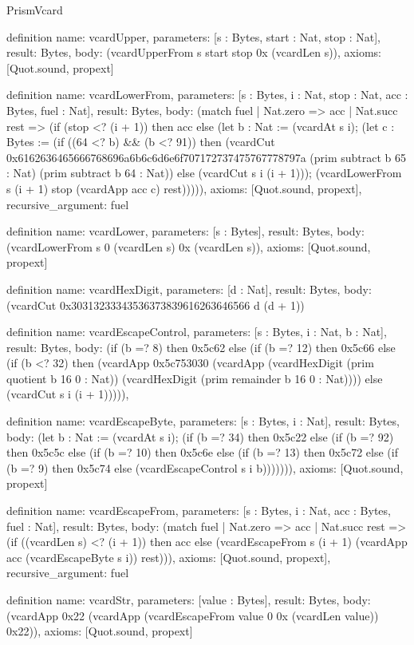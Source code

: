 \begin{lexlean}{PrismVcard}
\begin{semanticmodule}
definition{
  name: vcardUpper,
  parameters: [s : Bytes, start : Nat, stop : Nat],
  result: Bytes,
  body: (vcardUpperFrom s start stop 0x (vcardLen s)),
  axioms: [Quot.sound, propext]
}

definition{
  name: vcardLowerFrom,
  parameters: [s : Bytes, i : Nat, stop : Nat, acc : Bytes, fuel : Nat],
  result: Bytes,
  body: (match fuel
    | Nat.zero => acc
    | Nat.succ rest => (if (stop <? (i + 1)) then acc else (let b : Nat := (vcardAt s i); (let c : Bytes := (if ((64 <? b) && (b <? 91)) then (vcardCut 0x6162636465666768696a6b6c6d6e6f707172737475767778797a (prim subtract b 65 : Nat) (prim subtract b 64 : Nat)) else (vcardCut s i (i + 1))); (vcardLowerFrom s (i + 1) stop (vcardApp acc c) rest))))),
  axioms: [Quot.sound, propext],
  recursive_argument: fuel
}

definition{
  name: vcardLower,
  parameters: [s : Bytes],
  result: Bytes,
  body: (vcardLowerFrom s 0 (vcardLen s) 0x (vcardLen s)),
  axioms: [Quot.sound, propext]
}

definition{
  name: vcardHexDigit,
  parameters: [d : Nat],
  result: Bytes,
  body: (vcardCut 0x30313233343536373839616263646566 d (d + 1))
}

definition{
  name: vcardEscapeControl,
  parameters: [s : Bytes, i : Nat, b : Nat],
  result: Bytes,
  body: (if (b =? 8) then 0x5c62 else (if (b =? 12) then 0x5c66 else (if (b <? 32) then (vcardApp 0x5c753030 (vcardApp (vcardHexDigit (prim quotient b 16 0 : Nat)) (vcardHexDigit (prim remainder b 16 0 : Nat)))) else (vcardCut s i (i + 1))))),
}

definition{
  name: vcardEscapeByte,
  parameters: [s : Bytes, i : Nat],
  result: Bytes,
  body: (let b : Nat := (vcardAt s i); (if (b =? 34) then 0x5c22 else (if (b =? 92) then 0x5c5c else (if (b =? 10) then 0x5c6e else (if (b =? 13) then 0x5c72 else (if (b =? 9) then 0x5c74 else (vcardEscapeControl s i b))))))),
  axioms: [Quot.sound, propext]
}


definition{
  name: vcardEscapeFrom,
  parameters: [s : Bytes, i : Nat, acc : Bytes, fuel : Nat],
  result: Bytes,
  body: (match fuel
    | Nat.zero => acc
    | Nat.succ rest => (if ((vcardLen s) <? (i + 1)) then acc else (vcardEscapeFrom s (i + 1) (vcardApp acc (vcardEscapeByte s i)) rest))),
  axioms: [Quot.sound, propext],
  recursive_argument: fuel
}

definition{
  name: vcardStr,
  parameters: [value : Bytes],
  result: Bytes,
  body: (vcardApp 0x22 (vcardApp (vcardEscapeFrom value 0 0x (vcardLen value)) 0x22)),
  axioms: [Quot.sound, propext]
}


\end{semanticmodule}
\end{lexlean}
